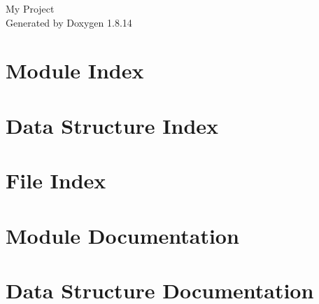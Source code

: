 \documentclass[twoside]{book}
\newcommand{\+}{\discretionary{\mbox{\scriptsize$\hookleftarrow$}}{}{}}
\newcommand{\clearemptydoublepage}{%
  \newpage{\pagestyle{empty}\cleardoublepage}%
}
\begin{document}
\hypersetup{pageanchor=false,
             bookmarksnumbered=true,
             pdfencoding=unicode
            }
\begin{titlepage}
\vspace*{7cm}
\begin{center}%
{\Large My Project }\\
\vspace*{1cm}
{\large Generated by Doxygen 1.8.14}\\
\end{center}
\end{titlepage}
\clearemptydoublepage
{}
\tableofcontents
\clearemptydoublepage
{}
\hypersetup{pageanchor=true}

\chapter{Module Index}

\chapter{Data Structure Index}

\chapter{File Index}

\chapter{Module Documentation}









\chapter{Data Structure Documentation}



























\end{document}
